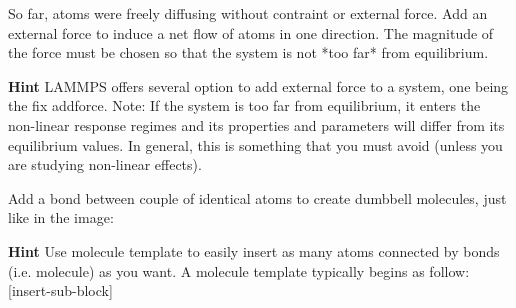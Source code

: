 So far, atoms were freely diffusing without contraint or external force.
Add an external force to induce a net flow of atoms in one
direction. The magnitude of the force must be chosen so
that the system is not *too far* from equilibrium.


\textbf{Hint} LAMMPS offers several option to add external force to a system, one 
being the fix addforce.
Note: If the system is too far from equilibrium, it enters the non-linear response 
regimes and its properties and parameters will differ from its equilibrium values.
In general, this is something that you must avoid (unless you are studying
non-linear effects). 






Add a bond between couple of identical atoms to create
dumbbell molecules, just like in the image:






\textbf{Hint} Use molecule template to easily insert as many atoms connected
by bonds (i.e. molecule) as you want. A molecule 
template typically begins as follow:
[insert-sub-block]


